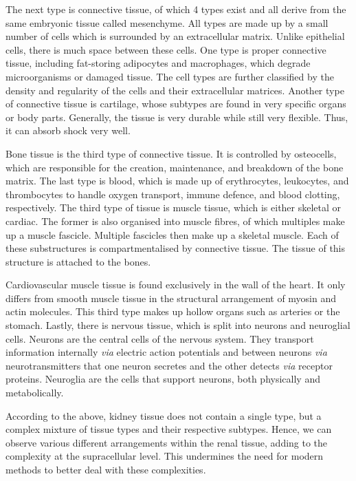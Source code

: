 The next type is connective tissue, of which 4 types exist and all derive from the same embryonic tissue called mesenchyme. All types are made up by a small number of cells which is surrounded by an extracellular matrix. Unlike epithelial cells, there is much space between these cells. One type is proper connective tissue, including fat-storing adipocytes and macrophages, which degrade microorganisms or damaged tissue. The cell types are further classified by the density and regularity of the cells and their extracellular matrices. 
Another type of connective tissue is cartilage, whose subtypes are found in very specific organs or body parts. Generally, the tissue is very durable while still very flexible. Thus, it can absorb shock very well.

Bone tissue is the third type of connective tissue. It is controlled by osteocells, which are responsible for the creation, maintenance, and breakdown of the bone matrix.
The last type is blood, which is made up of erythrocytes, leukocytes, and thrombocytes to handle oxygen transport, immune defence, and blood clotting, respectively.
The third type of tissue is muscle tissue, which is either skeletal or cardiac. The former is also organised into muscle fibres, of which multiples make up a muscle fascicle. Multiple fascicles then make up a skeletal muscle. Each of these substructures is compartmentalised by connective tissue. The tissue of this structure is attached to the bones.

Cardiovascular muscle tissue is found exclusively in the wall of the heart. It only differs from smooth muscle tissue in the structural arrangement of myosin and actin molecules. This third type makes up hollow organs such as arteries or the stomach.
Lastly, there is nervous tissue, which is split into neurons and neuroglial cells. Neurons are the central cells of the nervous system. They transport information internally \textit{via} electric action potentials and between neurons \textit{via} neurotransmitters that one neuron secretes and the other detects \textit{via} receptor proteins. Neuroglia are the cells that support neurons, both physically and metabolically. \cite{Ash2017Authors}

According to the above, kidney tissue does not contain a single type, but a complex mixture of tissue types and their respective subtypes. Hence, we can observe various different arrangements within the renal tissue, adding to the complexity at the supracellular level. This undermines the need for modern methods to better deal with these complexities.

